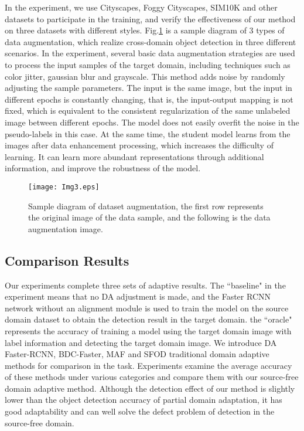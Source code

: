 \documentclass[sn-mathphys]{sn-jnl}%
\theoremstyle{thmstyleone}%
\theoremstyle{thmstyletwo}%
\theoremstyle{thmstylethree}%
\begin{document}
 In the experiment, we use Cityscapes\cite{cordts2016cityscapes}, Foggy Cityscapes, SIM10K and other datasets to participate in the training, and verify the effectiveness of our method on three datasets with different styles. Fig.\ref{fig3} is a sample diagram of 3 types of data augmentation, which realize cross-domain object detection in three different scenarios. In the experiment, several basic data augmentation strategies are used to process the input samples of the target domain, including techniques such as color jitter, gaussian blur and grayscale. This method adds noise by randomly adjusting the sample parameters. The input is the same image, but the input in different epochs is constantly changing, that is, the input-output mapping is not fixed, which is equivalent to the consistent regularization of the same unlabeled image between different epochs. The model does not easily overfit the noise in the pseudo-labels in this case. At the same time, the student model learns from the images after data enhancement processing, which increases the difficulty of learning. It can learn more abundant representations through additional information, and improve the robustness of the model.
\begin{figure}
	\texttt{[image: Img3.eps]}
	\caption{Sample diagram of dataset augmentation, the first row represents the original image of the data sample, and the following is the data augmentation image.} \label{fig3}
\end{figure}
%
%
\subsection{Comparison Results} 
Our experiments complete three sets of adaptive results. The ``baseline" in the experiment means that no DA adjustment is made, and the Faster RCNN network without an alignment module is used to train the model on the source domain dataset to obtain the detection result in the target domain. the ``oracle" represents the accuracy of training a model using the target domain image with label information and detecting the target domain image. We introduce DA Faster-RCNN\cite{chen2018domain}, BDC-Faster\cite{saito2019strong}, MAF\cite{he2019multi} and SFOD\cite{li2020free} traditional domain adaptive methods for comparison in the task. Experiments examine the average accuracy of these methods under various categories and compare them with our source-free domain adaptive method. Although the detection effect of our method is slightly lower than the object detection accuracy of partial domain adaptation, it has good adaptability and can well solve the defect problem of detection in the source-free domain.
\end{document}
